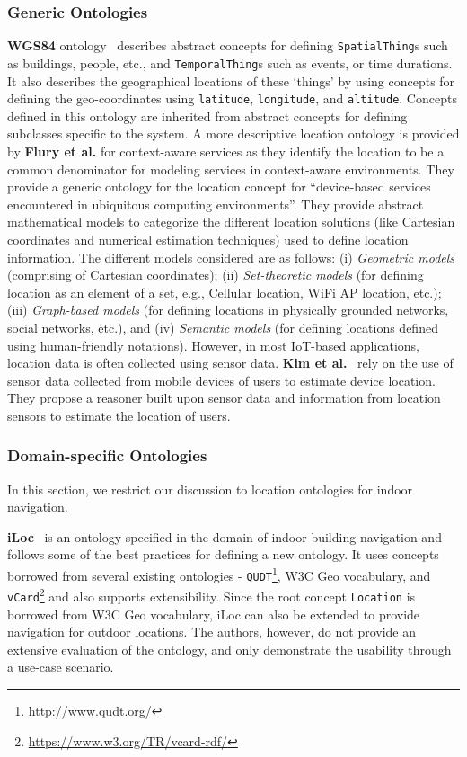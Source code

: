 \documentclass{elsart}  %
\begin{document}
\subsubsection{Generic Ontologies}
\textbf{WGS84} ontology~\cite{brickley2006basic} describes abstract concepts for defining \texttt{SpatialThing}s such as buildings, people, etc., and \texttt{TemporalThing}s such as events, or time durations. It also describes the geographical locations of these `things' by using concepts for defining the geo-coordinates using \texttt{latitude}, \texttt{longitude}, and \texttt{altitude}. Concepts defined in this ontology are inherited from abstract concepts for defining subclasses specific to the system. A more descriptive location ontology is provided by \textbf{Flury et al.}\cite{flury2004owl} for context-aware services as they identify the location to be a common denominator for modeling services in context-aware environments. 
They provide a generic ontology for the location concept for ``device-based services encountered in ubiquitous computing environments''. They provide abstract mathematical models to categorize the different location solutions (like Cartesian coordinates and numerical estimation techniques) used to define location information. The different models considered are as follows: (i) \textit{Geometric models} (comprising of Cartesian coordinates); (ii) \textit{Set-theoretic models} (for defining location as an element of a set, e.g., Cellular location, WiFi AP location, etc.); (iii) \textit{Graph-based models} (for defining locations in physically grounded networks, social networks, etc.), and (iv) \textit{Semantic models} (for defining locations defined using human-friendly notations). However, in most IoT-based applications, location data is often collected using sensor data. \textbf{Kim et al.}~\cite{kim2015ontology} rely on the use of sensor data collected from mobile devices of users to estimate device location. They propose a reasoner built upon sensor data and information from location sensors to estimate the location of users.
\subsubsection{Domain-specific Ontologies}
In this section, we restrict our discussion to location ontologies for indoor navigation.
\par 
\textbf{iLoc}~\cite{szasz2016iloc} is an ontology specified in the domain of indoor building navigation and follows some of the best practices for defining a new ontology. It uses concepts borrowed from several existing ontologies - \texttt{QUDT}\footnote{\url{http://www.qudt.org/}}, W3C Geo vocabulary, and \texttt{vCard}\footnote{\url{https://www.w3.org/TR/vcard-rdf/}} and also supports extensibility. Since the root concept \texttt{Location} is borrowed from W3C Geo vocabulary, iLoc can also be extended to provide navigation for outdoor locations. The authors, however, do not provide an extensive evaluation of the ontology, and only demonstrate the usability through a use-case scenario.
\end{document}
